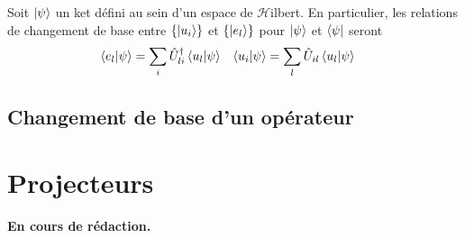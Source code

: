 \documentclass[../notesdecours.tex]{subfiles}
\begin{document}
\begin{Property}
	Soit $\ket{\psi}$ un ket défini au sein d'un espace de $\mathcal{H}$ilbert. En particulier, les relations de changement de base entre $\left\{\ket{u_i}\right\}$ et $\left\{\ket{e_l}\right\}$ pour $\ket{\psi}$ et $\bra{\psi}$ seront
	\begin{align}
		\braket{e_l|\psi} &= \sum_i \hat{U}^\dagger_{li} \braket{u_l|\psi} & \braket{u_i|\psi} &= \sum_l \hat{U}_{il} \braket{u_l|\psi} 
	\end{align}
\end{Property}

\subsection{Changement de base d'un opérateur}

\section{Projecteurs}
\color{blue} \textbf{En cours de rédaction.}
\end{document}
